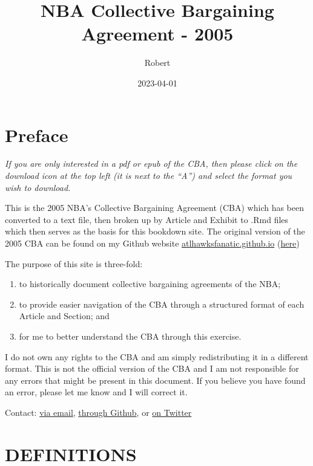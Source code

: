 \documentclass[
]{book}
\title{NBA Collective Bargaining Agreement - 2005}
\author{Robert}
\date{2023-04-01}
\providecommand{\tightlist}{%
  \setlength{\itemsep}{0pt}\setlength{\parskip}{0pt}}
\begin{document}
\maketitle

{
\setcounter{tocdepth}{1}
\tableofcontents
}
\hypertarget{preface}{%
\chapter*{Preface}\label{preface}}

\emph{If you are only interested in a pdf or epub of the CBA, then please click on the download icon at the top left (it is next to the ``A'') and select the format you wish to download.}

This is the 2005 NBA's Collective Bargaining Agreement (CBA) which has been converted to a text file, then broken up by Article and Exhibit to .Rmd files which then serves as the basis for this bookdown site. The original version of the 2005 CBA can be found on my Github website \href{https://atlhawksfanatic.github.io/}{atlhawksfanatic.github.io} (\href{https://github.com/atlhawksfanatic/atlhawksfanatic.github.io/raw/master/research/CBA/2005-NBA-NBPA-Collective-Bargaining-Agreement.pdf}{here})

The purpose of this site is three-fold:

\begin{enumerate}
\def\labelenumi{\arabic{enumi}.}
\tightlist
\item
  to historically document collective bargaining agreements of the NBA;
\item
  to provide easier navigation of the CBA through a structured format of each Article and Section; and
\item
  for me to better understand the CBA through this exercise.
\end{enumerate}

I do not own any rights to the CBA and am simply redistributing it in a different format. This is not the official version of the CBA and I am not responsible for any errors that might be present in this document. If you believe you have found an error, please let me know and I will correct it.

Contact: \href{atlhawksfanatic@gmail.com}{via email}, \href{https://github.com/atlhawksfanatic}{through Github}, or \href{https://twitter.com/atlhawksfanatic}{on Twitter}

\hypertarget{definitions}{%
\chapter{DEFINITIONS}\label{definitions}}
\end{document}

